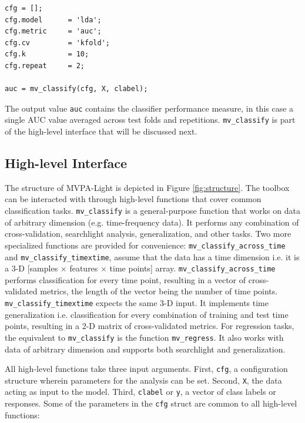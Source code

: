 \documentclass[utf8]{frontiersSCNS} %
\newcommand{\ttt}[1]{\texttt{#1}}
\begin{document}
\begin{verbatim}
cfg = [];
cfg.model      = 'lda';
cfg.metric     = 'auc';
cfg.cv         = 'kfold';
cfg.k          = 10;
cfg.repeat     = 2;

auc = mv_classify(cfg, X, clabel);
\end{verbatim}

The output value \ttt{auc} contains the classifier performance measure, in this case a single AUC value averaged across test folds and repetitions. \ttt{mv\_classify} is part of the high-level interface that will be discussed next.

\subsection{High-level Interface}\label{sec:interface}

The structure of MVPA-Light is depicted in Figure \ref{fig:structure}. The toolbox can be interacted with through high-level functions that cover common classification tasks. \ttt{mv\_classify} is a  general-purpose function that works on data of arbitrary dimension (e.g. time-frequency data). It performs any combination of cross-validation, searchlight analysis, generalization, and other tasks. Two more specialized functions are provided for convenience: \ttt{mv\_classify\_across\_time}  and \ttt{mv\_classify\_timextime}, assume that the data has a time dimension i.e. it is a 3-D [samples $\times$ features $\times$ time points] array. \ttt{mv\_classify\_across\_time} performs classification for every time point, resulting in a vector of cross-validated metrics, the length of the vector being the number of time points. \ttt{mv\_classify\_timextime} expects the same 3-D input. It implements time generalization \citep{King2014} i.e. classification for every combination of training and test time points, resulting in a 2-D matrix of cross-validated metrics. For regression tasks, the equivalent to \ttt{mv\_classify} is the function \ttt{mv\_regress}. It also works with data of arbitrary dimension and supports both searchlight and generalization.

All high-level functions take three input arguments. First, \ttt{cfg}, a configuration structure wherein parameters for the analysis can be set. Second, \ttt{X}, the data acting as input to the model. Third, \ttt{clabel} or \ttt{y}, a vector of class labels or responses. Some of the parameters in the \ttt{cfg} struct are common  to all high-level functions:
\end{document}
